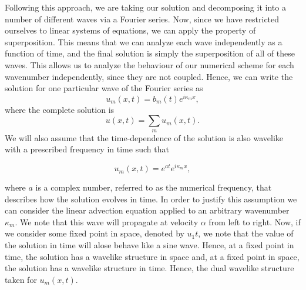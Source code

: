 Following this approach, we are taking our solution and decomposing it into a number of different waves via a Fourier series. Now, since we have restricted ourselves to linear systems of equations, we can apply the property of superposition. This means that we can analyze each wave independently as a function of time, and the final solution is simply the superposition of all of these waves. This allows us to analyze the behaviour of our numerical scheme for each wavenumber independently, since they are not coupled. Hence, we can write the solution for one particular wave of the Fourier series as
\begin{equation}
	u_m(x,t) = b_m(t) e^{i \kappa_m x},
\end{equation}
where the complete solution is
\begin{equation}
	u(x,t) = \sum_{m} u_m(x,t).
\end{equation}
We will also assume that the time-dependence of the solution is also wavelike with a prescribed frequency in time such that
\begin{eqBox}
\begin{equation}
	u_m(x,t) = e^{at} e^{i \kappa_m x},
\end{equation}
\end{eqBox}
where $a$ is a complex number, referred to as the numerical frequency, that describes how the solution evolves in time. In order to justify this assumption we can consider the linear advection equation applied to an arbitrary wavenumber $\kappa_m$. We note that this wave will propagate at velocity $\alpha$ from left to right. Now, if we consider some fixed point in space, denoted by $u_1{t}$, we note that the value of the solution in time will alose behave like a sine wave. Hence, at a fixed point in time, the solution has a wavelike structure in space and, at a fixed point in space, the solution has a wavelike structure in time. Hence, the dual wavelike structure taken for $u_m(x,t)$.

